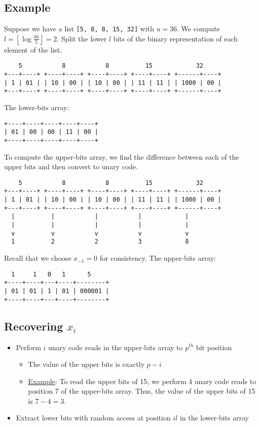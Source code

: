 \documentclass[10pt]{article}
\begin{document}
\subsection{Example}\label{example}
Suppose we have a list \texttt{[5, 8, 8, 15, 32]} with \(u= 36\).
We compute \(l = \left \lfloor \log{\frac{36}{5}} \right \rfloor = 2 \).
Split the lower \(l\) bits of the binary representation of each element of the list.
\begin{verbatim}
    5           8           8          15            32
+---+----+ +----+----+ +----+----+ +----+----+ +------+----+
| 1 | 01 | | 10 | 00 | | 10 | 00 | | 11 | 11 | | 1000 | 00 |
+---+----+ +----+----+ +----+----+ +----+----+ +------+----+
\end{verbatim}
The lower-bits array:
\begin{verbatim}
+----+----+----+----+----+
| 01 | 00 | 00 | 11 | 00 |
+----+----+----+----+----+
\end{verbatim}
To compute the upper-bits array, we find the difference between each of the upper bits
and then convert to unary code.
\begin{verbatim}
    5           8           8          15            32
+---+----+ +----+----+ +----+----+ +----+----+ +------+----+
| 1 | 01 | | 10 | 00 | | 10 | 00 | | 11 | 11 | | 1000 | 00 |
+---+----+ +----+----+ +----+----+ +----+----+ +------+----+
  |          |           |           |            |
  |          |           |           |            |
  v          v           v           v            v
  1          2           2           3            8
\end{verbatim}
Recall that we choose \(x_{-1} = 0\) for consistency.
The upper-bits array:
\begin{verbatim}
  1     1   0   1      5
+----+----+---+----+--------+
| 01 | 01 | 1 | 01 | 000001 |
+----+----+---+----+--------+
\end{verbatim}

\subsection{Recovering \texorpdfstring{\(x_i\)}{xi}}\label{recovering-xi}
\begin{itemize}
\item
    Perform \(i\) unary code reads in the upper-bits array to \(p^{th}\) bit position
    \begin{itemize}
    \item
        The value of the upper bits is exactly \(p - i\)
    \item
        \underline{Example}: To read the upper bits of 15, we perform 4 unary code reads to 
        position 7 of the upper-bits array.
        Thus, the value of the upper bits of 15 is \(7 - 4 = 3\).
    \end{itemize}
\item
    Extract lower bits with random access at position \(il\) in the lower-bits array
\end{itemize}
\end{document}
